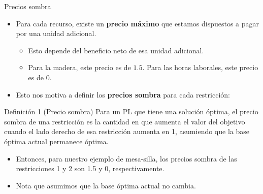 \documentclass{beamer}
\begin{document}
\begin{frame}{Precios sombra}
    \begin{itemize}
        \item Para cada recurso, existe un \textbf{precio máximo} que estamos dispuestos a pagar por una unidad adicional.
        \begin{itemize}
            \item Esto depende del beneficio neto de esa unidad adicional.
            \item Para la madera, este precio es de $1.5$. Para las horas laborales, este precio es de $0$.
        \end{itemize}
    \end{itemize}

    \begin{itemize}
        \item Esto nos motiva a definir los \textbf{precios sombra} para cada restricción:
    \end{itemize}
    
    \begin{block}{Definición 1 (Precio sombra)}
        Para un PL que tiene una solución óptima, el precio sombra de una restricción es la cantidad en que aumenta el valor del objetivo cuando el lado derecho de esa restricción aumenta en 1, asumiendo que la base óptima actual permanece óptima.
    \end{block}
    
    \begin{itemize}
        \item Entonces, para nuestro ejemplo de mesa-silla, los precios sombra de las restricciones 1 y 2 son 1.5 y 0, respectivamente.
    \end{itemize}
    
    \begin{itemize}
        \item Nota que asumimos que la base óptima actual no cambia.
    \end{itemize}
\end{frame}
\end{document}
